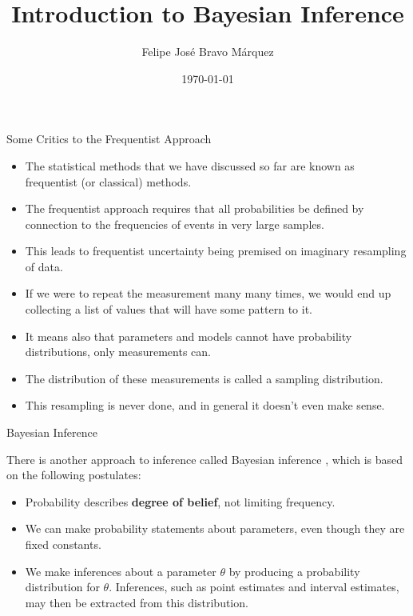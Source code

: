 \documentclass[handout]{beamer}
\title{Introduction to Bayesian Inference}
\author[Felipe Bravo Márquez]{\footnotesize
 \textcolor[rgb]{0.00,0.00,1.00}{Felipe José Bravo Márquez}}
\date{ \today }
\begin{document}
\begin{frame}
\titlepage


\end{frame}




\begin{frame}{Some Critics to the Frequentist Approach}
\scriptsize{
\begin{itemize}
 \item The statistical methods that we have discussed so far are known as frequentist (or classical) methods.
  \item The frequentist approach requires that all probabilities be defined by connection to the frequencies of events in very large samples. 
 \item This leads to frequentist uncertainty being premised on imaginary resampling of data. 
 \item If we were to repeat the measurement many many times, we would end up collecting a list of values that will have some pattern to it. 
 \item  It means also that parameters and models cannot have probability distributions, only measurements can.
 \item The distribution of these measurements is called a sampling distribution. 
 \item This resampling is never done, and in general it doesn't even make sense.
\end{itemize}

} 
\end{frame}

\begin{frame}{Bayesian Inference}
\scriptsize{
There is another approach to inference called Bayesian inference \cite{wasserman2013all}, which is based on the following postulates:
\begin{itemize}
 \item Probability describes \textbf{degree of belief}, not limiting frequency. 
 
 
 \item We can make probability statements about parameters, even though they are fixed constants.
 \item We make inferences about a parameter $\theta$ by producing a probability distribution for $\theta$. Inferences, such as point estimates and interval estimates, may then be extracted from this distribution.
\end{itemize}

} 
\end{frame}
\end{document}
